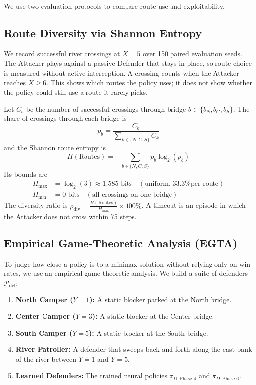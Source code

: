 \documentclass[conference]{IEEEtran}
\begin{document}
We use two evaluation protocols to compare route use and exploitability.

\subsection{Route Diversity via Shannon Entropy}
We record successful river crossings at $X=5$ over 150 paired evaluation seeds. The Attacker plays against a passive Defender that stays in place, so route choice is measured without active interception. A crossing counts when the Attacker reaches $X \ge 6$. This shows which routes the policy uses; it does not show whether the policy could still use a route it rarely picks.

Let $C_b$ be the number of successful crossings through bridge $b \in \{b_N, b_C, b_S\}$. The share of crossings through each bridge is
\begin{equation}
p_b = \frac{C_b}{\sum_{k \in \{N, C, S\}} C_k}
\end{equation}
and the Shannon route entropy is
\begin{equation}
H(\text{Routes}) = -\sum_{b \in \{N, C, S\}} p_b \log_2(p_b)
\end{equation}
Its bounds are
\begin{align}
H_{\max} &= \log_2(3) \approx 1.585 \text{ bits} \quad (\text{uniform, 33.3\% per route}) \\
H_{\min} &= 0 \text{ bits} \quad (\text{all crossings on one bridge})
\end{align}
The diversity ratio is $\rho_{\text{div}} = \frac{H(\text{Routes})}{H_{\max}} \times 100\%$. A timeout is an episode in which the Attacker does not cross within 75 steps.

\subsection{Empirical Game-Theoretic Analysis (EGTA)}
To judge how close a policy is to a minimax solution without relying only on win rates, we use an empirical game-theoretic analysis. We build a suite of defenders $\mathcal{P}_{\text{def}}$:
\begin{enumerate}
    \item \textbf{North Camper ($Y=1$):} A static blocker parked at the North bridge.
    \item \textbf{Center Camper ($Y=3$):} A static blocker at the Center bridge.
    \item \textbf{South Camper ($Y=5$):} A static blocker at the South bridge.
    \item \textbf{River Patroller:} A defender that sweeps back and forth along the east bank of the river between $Y=1$ and $Y=5$.
    \item \textbf{Learned Defenders:} The trained neural policies $\pi_{D, \text{Phase 4}}$ and $\pi_{D, \text{Phase 6}}$.
\end{enumerate}
\end{document}
